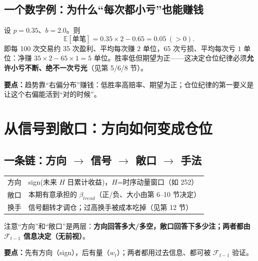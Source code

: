 \documentclass[UTF8,11pt]{ctexart}
\newcommand{\takeaway}[1]{\medskip\par\noindent\textbf{要点：}#1\par\medskip}
\begin{document}
\subsection{一个数字例：为什么“每次都小亏”也能赚钱}
设 $p=0.35$、$b=2.0$。则
$$
\mathbb{E}[\text{单笔}]=0.35\times2 -0.65 = 0.05 \ (>0).
$$
即每 100 次交易约 35 次盈利、平均每次赚 $2$ 单位，65 次亏损、平均每次亏 $1$ 单位：净赚 $35\times2-65\times1=5$ 单位。胜率低但期望为正——这决定仓位纪律必须\textbf{允许小亏不断、绝不一次亏光}（见第 5/6/8 节）。

\takeaway{趋势靠“右偏分布”赚钱：低胜率高赔率、期望为正；仓位纪律的第一要义是让这个右偏能活到“对的时候”。}

\section{从信号到敞口：方向如何变成仓位}
\subsection{一条链：方向 $\to$ 信号 $\to$ 敞口 $\to$ 手法}
\begin{center}
\renewcommand{\arraystretch}{1.35}
\begin{tabular}{@{}l>{\raggedright\arraybackslash}p{4.6cm}@{}}
\midrule
方向 & sign(未来 $H$ 日累计收益)，$H$=时序动量窗口（如 252） \\
敞口 & 本期有意承担的 $\beta_{trend}$（正/负、大小由第 6--10 节决定） \\
换手 & 信号翻转才调仓；过高换手被成本吃掉（见第 12 节） \\
\bottomrule
\end{tabular}
\end{center}
注意“方向”和“敞口”是两层：\textbf{方向回答多大/多空，敞口回答下多少注；两者都由 $\mathcal{F}_{t-1}$ 信息决定（无前视）}。
\takeaway{先有方向（sign），后有量（$w_t$）；两者都用过去信息、都可被 $\mathcal{F}_{t-1}$ 验证。}
\end{document}

